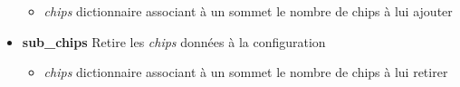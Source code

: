 \documentclass{article}
\begin{document}
\begin{itemize}
					\begin{itemize}
						\item \textit{chips}\newline
						dictionnaire associant à un sommet le nombre de chips à lui ajouter
					\end{itemize}
					\item \textbf{sub\_chips}\newline
					Retire les \textit{chips} données à la configuration
					\begin{itemize}
						\item \textit{chips}\newline
						dictionnaire associant à un sommet le nombre de chips à lui retirer
					\end{itemize}
				\end{itemize}
	
\end{document}
